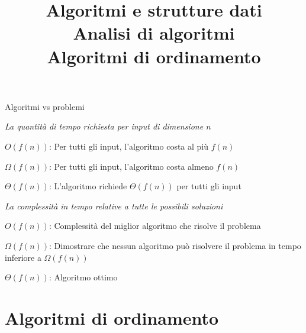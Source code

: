 \begin{frame}{Algoritmi vs problemi}

\vspace{-9pt}
\begin{myboxtitle}
{\em La quantità di tempo richiesta per input di dimensione $n$}
\BI
\item \alert{$O(f(n))$}: Per tutti gli input, l'algoritmo costa al più $f(n)$ 
\item \alert{$\Omega(f(n))$}: Per tutti gli input, l'algoritmo costa almeno $f(n)$ 
\item \alert{$\Theta(f(n))$}: L'algoritmo richiede $\Theta(f(n))$ per tutti gli input
\EI
\end{myboxtitle}

\begin{myboxtitle}
{\em La complessità in tempo relative a tutte le possibili soluzioni}
\BI
\item \alert{$O(f(n))$}: Complessità del miglior algoritmo che risolve il 
problema
\item \alert{$\Omega(f(n))$}: Dimostrare che nessun algoritmo può risolvere il problema in tempo inferiore a $\Omega(f(n))$
\item \alert{$\Theta(f(n))$}: Algoritmo ottimo
\EI
\end{myboxtitle}



\end{frame}



\title[ASD - Analisi di algoritmi]{\textbf{Algoritmi e strutture dati}\\[12pt]Analisi di algoritmi\\Algoritmi di ordinamento}

\FrameTitle

\section{Algoritmi di ordinamento}

